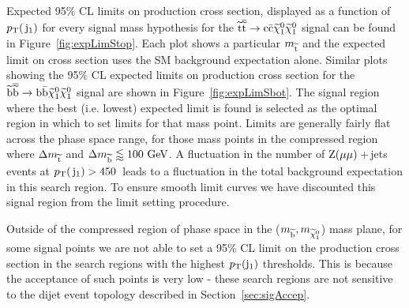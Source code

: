 Expected 95\% CL limits on production cross section, displayed as a function of $p_{\text{T}}(\,\mathrm{j}_1)$ for every signal mass hypothesis for the $\widetilde{{\rm t}} \overline{\widetilde{\mathrm{t}}} \rightarrow \rm c \bar{\rm c} \widetilde{\chi}^{0}_{1} \widetilde{\chi}^{0}_{1}$ signal can be found in Figure~\ref{fig:expLimStop}. 
Each plot shows a particular $m_{\widetilde{{\rm t}}}$ and the expected limit on cross section uses the \ac{SM} background expectation alone. 
Similar plots showing the 95\% CL expected limits on production cross section for the $\widetilde{{\rm b}} \overline{\widetilde{\mathrm{b}}} \rightarrow \rm b \bar{\rm b} \widetilde{\chi}^{0}_{1} \widetilde{\chi}^{0}_{1}$ signal are shown in 
Figure~\ref{fig:expLimSbot}.
The signal region where the best (i.e. lowest) expected limit is found is selected as the optimal region in which to set limits for that mass point.
Limits are generally fairly flat across the phase space range, for those mass points in the compressed region where $\Delta m_{\widetilde{{\rm t}}}$ and $\Delta m_{\widetilde{{\rm b}}} \lessapprox 100~\mathrm{GeV}$.
A fluctuation in the number of $\mathrm{Z} (\mu \mu)${}\,+\,jets events at $p_{\text{T}}(\,\mathrm{j}_1)>450$~\GeV leads to a fluctuation in the total background expectation in this search region. 
To ensure smooth limit curves we have discounted this signal region from the limit setting procedure. 

Outside of the compressed region of phase space in the ($m_{\widetilde{{\rm b}}}, m_{\widetilde{\chi}^{0}_{1}}$) mass plane, for some signal points we are not able to set a 95\% CL limit on the production cross section in the search regions with the highest $p_{\text{T}}({\rm j}_1)$ thresholds. 
This is because the acceptance of such points is very low - these search regions are not sensitive to the dijet event topology described in Section~\ref{sec:sigAccep}.

